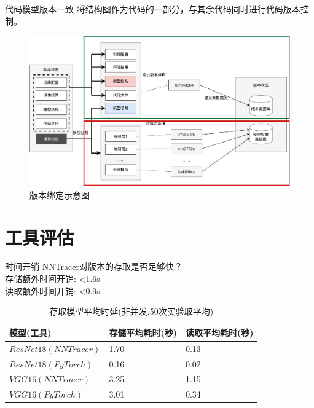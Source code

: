 \documentclass{beamer}
\begin{document}
\begin{frame}{代码模型版本一致}
将结构图作为代码的一部分，与其余代码同时进行代码版本控制。
\begin{figure}
    \centering
    \includegraphics[height=0.5\textheight]{consistency.pdf}
    \caption{版本绑定示意图}
    \label{fig:snapshot}
\end{figure}
\end{frame}


\section{工具评估}
\begin{frame}{时间开销}
NNTracer对版本的存取是否足够快？\\
存储额外时间开销: <1.6s\\
读取额外时间开销: <0.9s
\begin{table}
\label{check}
\begin{center}
 \begin{tabular}{| m{3.2cm} | m{3.2cm} | m{3.2cm}|} 
 \hline
 模型(工具) & 存储平均耗时(秒) & 读取平均耗时(秒) \\ 
  \hline\hline
  $ResNet18(NNTracer)$ & 1.70 & 0.13\\
 \hline
 $ResNet18(PyTorch)$ & 0.16 & 0.02 \\ 
   \hline
 $VGG16(NNTracer)$ & 3.25 & 1.15 \\ 
  \hline
 $VGG16(PyTorch)$ & 3.01 & 0.34 \\ 
 \hline
\end{tabular}
\caption{存取模型平均时延(非并发,50次实验取平均)}
\end{center}
\end{table}
\end{frame}
\end{document}
